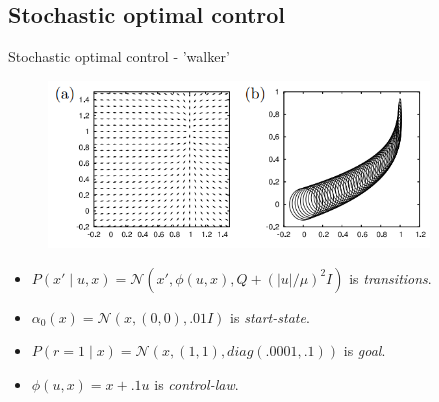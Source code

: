 \documentclass[]{beamer}
\theoremstyle{definition}
\begin{document}
\subsection{Stochastic optimal control}

\begin{frame}{Stochastic optimal control - 'walker'}
    \begin{figure}
        \centering
        \includegraphics[width=0.9\textwidth]{figs/fig_4ab_control_example.png}
        \label{fig:my_label}
    \end{figure}
    \vspace*{-0.6cm}
    \begin{alertblock}{}
    \begin{itemize}
        \item $P(x' \mid u, x) = \mathcal{N}(x', \phi(u, x), Q + (|u|/\mu)^2 I)$ is \emph{transitions}.
        \item $\alpha_0(x) = \mathcal{N}(x, (0,0), .01I)$ \quad \quad \quad \quad \quad \quad \quad is   \emph{start-state}.
        \item $P(r=1 \mid x) = \mathcal{N}(x, (1,1), diag(.0001,.1))$ is \emph{goal}.
        \item $\phi(u, x) = x + .1u$ \quad \quad \quad \quad \quad \quad \quad \quad \quad \quad \quad is \emph{control-law}.
    \end{itemize}
    \end{alertblock}
    

\end{frame}
\end{document}
